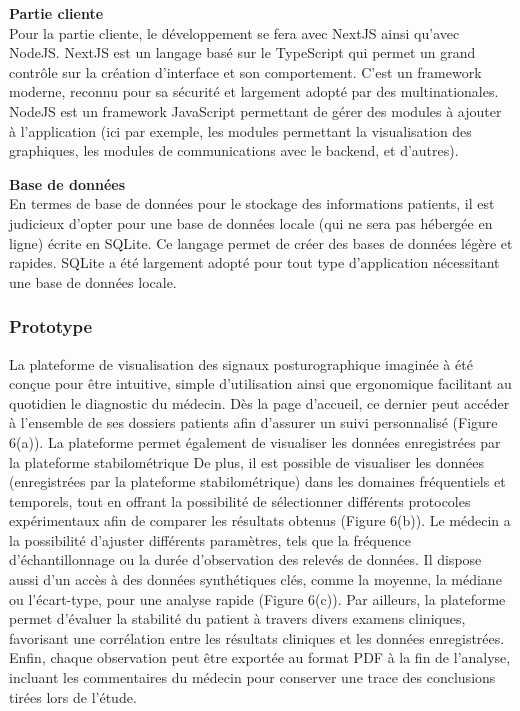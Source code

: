\textbf{Partie cliente} \\
Pour la partie cliente, le développement se fera avec NextJS ainsi qu'avec NodeJS.
NextJS est un langage basé sur le TypeScript qui permet un grand contrôle sur la création d'interface et son comportement.
C'est un framework moderne, reconnu pour sa sécurité et largement adopté par des multinationales.
NodeJS est un framework JavaScript permettant de gérer des modules à ajouter à l'application (ici par exemple, les modules permettant la visualisation des graphiques, les modules de communications avec le backend, et d'autres).

\textbf{Base de données} \\
En termes de base de données pour le stockage des informations patients, il est judicieux d’opter pour une base de données locale (qui ne sera pas hébergée en ligne) écrite en SQLite.
Ce langage permet de créer des bases de données légère et rapides.
SQLite a été largement adopté pour tout type d’application nécessitant une base de données locale.

\subsubsection{Prototype}
La plateforme de visualisation des signaux posturographique imaginée à été conçue 
pour être intuitive, simple d’utilisation ainsi que ergonomique facilitant au 
quotidien le diagnostic du médecin. Dès la page d’accueil, ce dernier peut accéder 
à l’ensemble de ses dossiers patients afin d’assurer un suivi personnalisé 
(Figure 6(a)). La plateforme permet également de visualiser les données 
enregistrées par la plateforme stabilométrique 
De plus, il est possible de visualiser les données 
(enregistrées par la plateforme stabilométrique) dans les domaines fréquentiels 
et temporels, tout en offrant la possibilité de sélectionner différents protocoles 
expérimentaux afin de comparer les résultats obtenus (Figure 6(b)). Le médecin a 
la possibilité d’ajuster différents paramètres, tels que la fréquence 
d’échantillonnage ou la durée d’observation des relevés de données.  Il dispose 
aussi d’un accès à des données synthétiques clés, comme la moyenne, la médiane ou 
l’écart-type, pour une analyse rapide (Figure 6(c)). Par ailleurs, la plateforme 
permet d’évaluer la stabilité du patient à travers divers examens cliniques, 
favorisant une corrélation entre les résultats cliniques et les données 
enregistrées. Enfin, chaque observation peut être exportée au format PDF à la fin 
de l’analyse, incluant les commentaires du médecin pour conserver une trace des 
conclusions tirées lors de l’étude.


